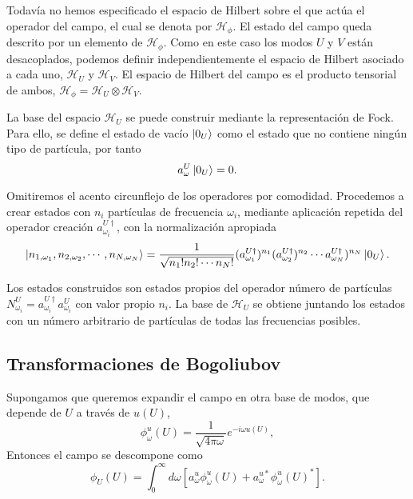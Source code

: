 Todavía no hemos especificado el espacio de Hilbert sobre el que actúa el operador del campo, el cual
se denota por $\mathcal H_\phi$. 
El estado del campo queda descrito por un elemento de $\mathcal H_\phi$.
Como en este caso los modos $U$ y $V$ están desacoplados, podemos definir independientemente el espacio
de Hilbert asociado a cada uno, $\mathcal H_U$ y $\mathcal H_V$.
El espacio de Hilbert del campo es el producto tensorial de ambos, $\mathcal H_\phi=\mathcal H_U\otimes \mathcal H_V$.

La base del espacio $\mathcal H_U$ se puede construir mediante la representación de Fock. 
Para ello, se define el estado de vacío $\ket{0_U}$ como el estado que no contiene ningún tipo
de partícula, por tanto
\begin{equation}
  a^U_\omega \ket{0_U} = 0.
\end{equation}

Omitiremos el acento circunflejo de los operadores por comodidad.
Procedemos a crear estados con $n_i$ partículas de frecuencia $\omega_i$, mediante
aplicación repetida del operador creación $a_{\omega_i}^{U\dagger}$, con la normalización apropiada
\begin{equation}
  \ket{n_{1,\omega_1}, n_{2,\omega_2},\cdots,n_{N,\omega_N}} = \frac{1}{\sqrt{n_1!n_2!\cdots n_N!}}(a_{\omega_1}^{U\dagger})^{n_1}
  (a_{\omega_2}^{U\dagger})^{n_2}\cdots a_{\omega_N}^{U\dagger})^{n_N} \ket{0_U}.
\end{equation}

Los estados construidos son estados propios del operador número de partículas $N_{\omega_i}^U=a_{\omega_i}^{U\dagger}a_{\omega_i}^U$
con valor propio $n_i$.
La base de $\mathcal H_U$ se obtiene juntando los estados con un número arbitrario de partículas
de todas las frecuencias posibles.

\subsection{Transformaciones de Bogoliubov}

Supongamos que queremos expandir el campo en otra base de modos, que depende de $U$ a través de  $u(U)$,
\begin{equation}
  \phi_\omega^u(U)=\frac{1}{\sqrt{4\pi\omega}}e^{-i\omega u(U)}, 
\end{equation}
Entonces el campo se descompone como
\begin{equation}
  \phi_U(U) = \int_0^\infty d\omega [a_\omega^u \phi^u_\omega(U) +  a_\omega^{u*} \phi_\omega^u(U)^*].
\end{equation}

